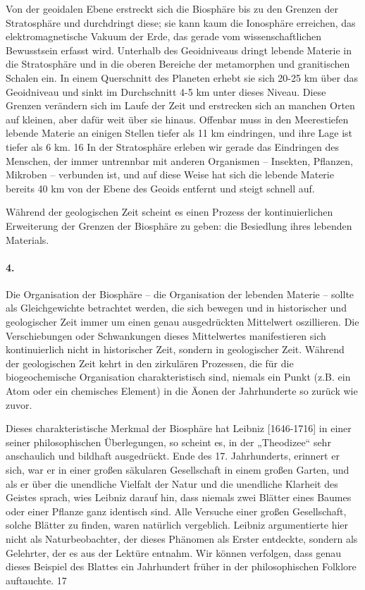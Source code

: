 \documentclass[11pt,a4paper]{book}
\begin{document}
Von der geoidalen Ebene erstreckt sich die Biosphäre bis zu den Grenzen der
Stratosphäre und durchdringt diese; sie kann kaum die Ionosphäre erreichen,
das elektromagnetische Vakuum der Erde, das gerade vom wissenschaftlichen
Bewusstsein erfasst wird. Unterhalb des Geoidniveaus dringt lebende Materie in
die Stratosphäre und in die oberen Bereiche der metamorphen und granitischen
Schalen ein. In einem Querschnitt des Planeten erhebt sie sich 20-25 km über
das Geoidniveau und sinkt im Durchschnitt 4-5 km unter dieses Niveau. Diese
Grenzen verändern sich im Laufe der Zeit und erstrecken sich an manchen Orten
auf kleinen, aber dafür weit über sie hinaus. Offenbar muss in den
Meerestiefen lebende Materie an einigen Stellen tiefer als 11 km eindringen,
und ihre Lage ist tiefer als 6 km. 16 In der Stratosphäre erleben wir gerade
das Eindringen des Menschen, der immer untrennbar mit anderen Organismen --
Insekten, Pflanzen, Mikroben -- verbunden ist, und auf diese Weise hat sich
die lebende Materie bereits 40 km von der Ebene des Geoids entfernt und steigt
schnell auf.

Während der geologischen Zeit scheint es einen Prozess der kontinuierlichen
Erweiterung der Grenzen der Biosphäre zu geben: die Besiedlung ihres lebenden
Materials.

\paragraph{4.}
Die Organisation der Biosphäre -- die Organisation der lebenden Materie --
sollte als Gleichgewichte betrachtet werden, die sich bewegen und in
historischer und geologischer Zeit immer um einen genau ausgedrückten
Mittelwert oszillieren. Die Verschiebungen oder Schwankungen dieses
Mittelwertes manifestieren sich kontinuierlich nicht in historischer Zeit,
sondern in geologischer Zeit. Während der geologischen Zeit kehrt in den
zirkulären Prozessen, die für die biogeochemische Organisation
charakteristisch sind, niemals ein Punkt (z.B. ein Atom oder ein chemisches
Element) in die Äonen der Jahrhunderte so zurück wie zuvor.

Dieses charakteristische Merkmal der Biosphäre hat Leibniz [1646-1716] in
einer seiner philosophischen Überlegungen, so scheint es, in der „Theodizee“
sehr anschaulich und bildhaft ausgedrückt. Ende des 17. Jahrhunderts, erinnert
er sich, war er in einer großen säkularen Gesellschaft in einem großen Garten,
und als er über die unendliche Vielfalt der Natur und die unendliche Klarheit
des Geistes sprach, wies Leibniz darauf hin, dass niemals zwei Blätter eines
Baumes oder einer Pflanze ganz identisch sind. Alle Versuche einer großen
Gesellschaft, solche Blätter zu finden, waren natürlich vergeblich. Leibniz
argumentierte hier nicht als Naturbeobachter, der dieses Phänomen als Erster
entdeckte, sondern als Gelehrter, der es aus der Lektüre entnahm. Wir können
verfolgen, dass genau dieses Beispiel des Blattes ein Jahrhundert früher in
der philosophischen Folklore auftauchte. 17
\end{document}
